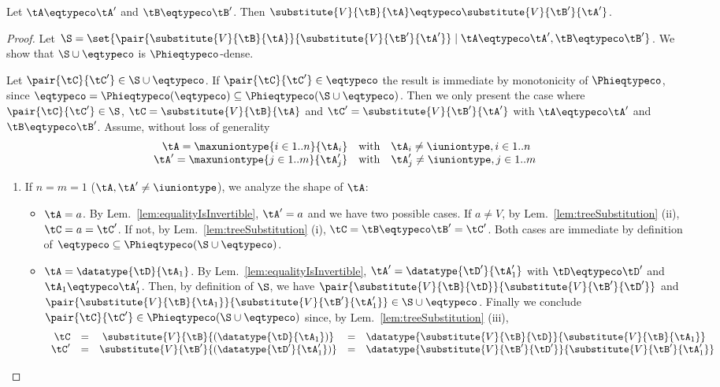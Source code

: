 \begin{lemma}
\label{lem:substitutionOfEqtypesCo}
Let $\tA \eqtypeco \tA'$ and $\tB \eqtypeco \tB'$. Then
$\substitute{V}{\tB}{\tA} \eqtypeco \substitute{V}{\tB'}{\tA'}$.
\end{lemma}

\begin{proof}
Let $\S = \set{\pair{\substitute{V}{\tB}{\tA}}{\substitute{V}{\tB'}{\tA'}}
\mathrel| \tA \eqtypeco \tA', \tB \eqtypeco \tB'}$. We show that $\S \cup
\mathbin{\eqtypeco}$ is $\Phieqtypeco$-dense.

Let $\pair{\tC}{\tC'} \in \S \cup \mathbin{\eqtypeco}$. If $\pair{\tC}{\tC'}
\in \mathbin{\eqtypeco}$ the result is immediate by monotonicity of
$\Phieqtypeco$, since $\mathbin{\eqtypeco} =
\Phieqtypeco\!\left(\eqtypeco\right) \subseteq \Phieqtypeco\!\left(\S \cup
\mathbin{\eqtypeco}\right)$. Then we only present the case where
$\pair{\tC}{\tC'} \in \S$, $\tC = \substitute{V}{\tB}{\tA}$ and $\tC' =
\substitute{V}{\tB'}{\tA'}$ with $\tA \eqtypeco \tA'$ and $\tB \eqtypeco \tB'$.
Assume, without loss of generality $$
\begin{array}{r@{\quad\text{with}\quad}l}
\tA  = \maxuniontype{i \in 1..n}{\tA_i}  & \tA_i  \neq \iuniontype, i \in 1..n \\
\tA' = \maxuniontype{j \in 1..m}{\tA'_j} & \tA'_j \neq \iuniontype, j \in 1..m
\end{array} $$

\begin{enumerate}
  \item If $n = m = 1$ (\ie $\tA, \tA' \neq \iuniontype$), we analyze the shape
  of $\tA$:
  \begin{itemize}
    \item $\tA = a$. By Lem.~\ref{lem:equalityIsInvertible}, $\tA' = a$ and we
    have two possible cases. If $a \neq V$, by Lem.~\ref{lem:treeSubstitution}
    (ii), $\tC = a = \tC'$. If not, by Lem.~\ref{lem:treeSubstitution} (i),
    $\tC = \tB \eqtypeco \tB' = \tC'$. Both cases are immediate by definition
    of $\mathbin{\eqtypeco} \subseteq \Phieqtypeco\!\left(\S \cup
    \mathbin{\eqtypeco}\right)$.
    
    \item $\tA = \datatype{\tD}{\tA_1}$. By
    Lem.~\ref{lem:equalityIsInvertible}, $\tA' = \datatype{\tD'}{\tA'_1}$ with
    $\tD \eqtypeco \tD'$ and $\tA_1 \eqtypeco \tA'_1$. Then, by definition of
    $\S$, we have $\pair{\substitute{V}{\tB}{\tD}}{\substitute{V}{\tB'}{\tD'}}$
    and $\pair{\substitute{V}{\tB}{\tA_1}}{\substitute{V}{\tB'}{\tA'_1}} \in \S
    \cup \mathbin{\eqtypeco}$. Finally we conclude $\pair{\tC}{\tC'} \in
    \Phieqtypeco\!\left(\S \cup \mathbin{\eqtypeco}\right)$ since, by
    Lem.~\ref{lem:treeSubstitution} (iii), $$
\begin{array}{r@{\quad=\quad}c@{\quad=\quad}l}
\tC  & \substitute{V}{\tB}{(\datatype{\tD}{\tA_1})}    & \datatype{\substitute{V}{\tB}{\tD}}{\substitute{V}{\tB}{\tA_1}} \\
\tC' & \substitute{V}{\tB'}{(\datatype{\tD'}{\tA'_1})} & \datatype{\substitute{V}{\tB'}{\tD'}}{\substitute{V}{\tB'}{\tA'_1}}
\end{array} $$


\end{itemize}
\end{enumerate}
\end{proof}
